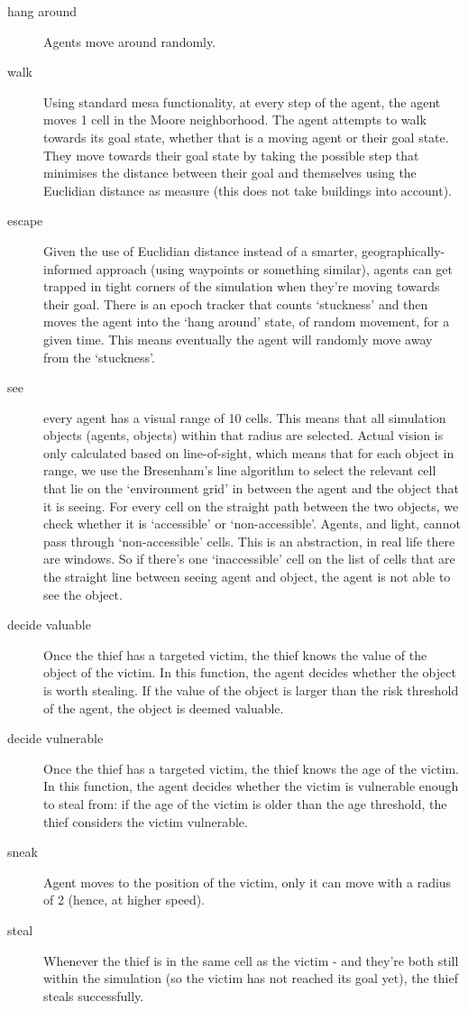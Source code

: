 \documentclass[12pt]{article}
\begin{document}
\begin{description}
\item [hang around] Agents move around randomly.
\item [walk] Using standard mesa functionality, at every step of the agent, the agent moves 1 cell in the Moore neighborhood. The agent attempts to walk towards its goal state, whether that is a moving agent or their goal state. They move towards their goal state by taking the possible step that minimises the distance between their goal and themselves using the Euclidian distance as measure (this does not take buildings into account).
\item [escape]  Given the use of Euclidian distance instead of a smarter, geographically-informed approach (using waypoints or something similar), agents can get trapped in tight corners of the simulation when they're moving towards their goal. There is an epoch tracker that counts `stuckness' and then moves the agent into the `hang around' state, of random movement, for a given time. This means eventually the agent will randomly move away from the `stuckness'.
\item [see] every agent has a visual range of 10 cells. This means that all simulation objects (agents, objects) within that radius are selected. Actual vision is only calculated based on line-of-sight, which means that for each object in range, we use the Bresenham's line algorithm to select the relevant cell that lie on the `environment grid' in between the agent and the object that it is seeing. For every cell on the straight path between the two objects, we check whether it is `accessible' or `non-accessible'. Agents, and light, cannot pass through `non-accessible' cells. This is an abstraction, in real life there are windows. So if there's one `inaccessible' cell on the list of cells that are the straight line between seeing agent and object, the agent is not able to see the object. 
\item [decide valuable] Once the thief has a targeted victim, the thief knows the value of the object of the victim. In this function, the agent decides whether the object is worth stealing. If the value of the object is larger than the risk threshold of the agent, the object is deemed valuable.
\item [decide vulnerable] Once the thief has a targeted victim, the thief knows the age of the victim. In this function, the agent decides whether the victim is vulnerable enough to steal from: if the age of the victim is older than the age threshold, the thief considers the victim vulnerable.
\item [sneak] Agent moves to the position of the victim, only it can move with a radius of 2 (hence, at higher speed).
\item [steal] Whenever the thief is in the same cell as the victim - and they're both still within the simulation (so the victim has not reached its goal yet), the thief steals successfully.
\end{description}
\end{document}
